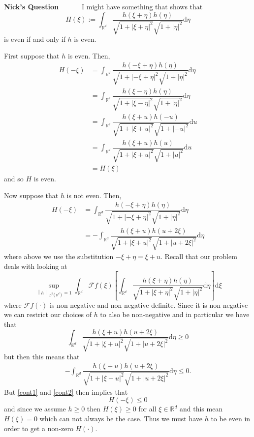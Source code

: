\documentclass[a4paper,11pt]{article}
\numberwithin{equation}{section}
\theoremstyle{plain}
\theoremstyle{definition}
\newcommand{\ud}{\ensuremath{\mathrm{d}}}
\newcommand{\Norm}[1]{\left\|  #1   \right\|}
\newcommand{\R}{\mathbb{R}}
\newcounter{NQ}
\newenvironment{NickQuestion}[1][] %
{\refstepcounter{NQ}
	\begin{mdframed}[backgroundcolor=lightgray]\textbf{Nick's Question \theNQ \: #1~~}~~~\noindent}%
	{\end{mdframed}}
\numberwithin{NQ}{section}
\numberwithin{LQ}{section}
\numberwithin{ZQ}{section}
\begin{document}
\begin{NickQuestion}
	I might have something that shows that 
	\[
		H(\xi) := \int_{\R^d} \dfrac{h(\xi+\eta)h(\eta)}{\sqrt{1+|\xi + \eta|^2}\sqrt{1+|\eta|^2}} \ud \eta
	\]
	is even if and only if $h$ is even. 
	
	First suppose that $h$ is even. Then, 
	\begin{align*}
			H(-\xi) &= \int_{\R^d} \dfrac{h(-\xi+\eta)h(\eta)}{\sqrt{1+|-\xi + \eta|^2}\sqrt{1+|\eta|^2}} \ud \eta
			\\&= \int_{\R^d} \dfrac{h(\xi-\eta)h(\eta)}{\sqrt{1+|\xi - \eta|^2}\sqrt{1+|\eta|^2}} \ud \eta
			\\&= \int_{\R^d} \dfrac{h(\xi+u)h(-u)}{\sqrt{1+|\xi +u|^2}\sqrt{1+|-u|^2}} \ud u
			\\& = \int_{\R^d} \dfrac{h(\xi+u)h(u)}{\sqrt{1+|\xi +u|^2}\sqrt{1+|u|^2}} \ud u
			\\& = H(\xi)
	\end{align*}
and so $H$ is even. 

Now suppose that $h$ is not even. Then,
\begin{align}
		H(-\xi) &= \int_{\R^d} \dfrac{h(-\xi+\eta)h(\eta)}{\sqrt{1+|-\xi + \eta|^2}\sqrt{1+|\eta|^2}} \ud \eta \nonumber
		\\&= -\int_{\R^d} \dfrac{h(\xi+u)h(u+2\xi)}{\sqrt{1+|\xi + u|^2}\sqrt{1+|u+2\xi|^2}} \ud \eta \label{cont1}
\end{align}
where above we use the substitution $-\xi +\eta = \xi +u$. Recall that our problem deals with looking at 
\[
	\sup_{\Norm{h}_{L^2(\R^d)}=1} \int_{\R^d} \mathcal{F}{f}(\xi) \left[ \int_{\R^d} \dfrac{h(\xi+\eta)h(\eta)}{\sqrt{1+|\xi + \eta|^2}\sqrt{1+|\eta|^2}} \ud \eta \right] \ud \xi
\]
where $\mathcal{F}{f}(\cdot)$ is non-negative and non-negative definite. Since it is non-negative we can restrict our choices of $h$ to also be non-negative and in particular we have that 
\[
	\int_{\R^d} \dfrac{h(\xi+u)h(u+2\xi)}{\sqrt{1+|\xi + u|^2}\sqrt{1+|u+2\xi|^2}} \ud \eta \ge 0
\]
but then this means that 
\begin{align}
	-\int_{\R^d} \dfrac{h(\xi+u)h(u+2\xi)}{\sqrt{1+|\xi + u|^2}\sqrt{1+|u+2\xi|^2}} \ud \eta \le 0. \label{cont2}
\end{align}
But \eqref{cont1} and \eqref{cont2} then implies that 
\[ 
	H(-\xi) \le 0
\]
and since we assume $h \ge 0$ then $H(\xi) \ge 0$ for all $\xi \in \R^d$ and this mean $H(\xi)=0$ which can not always be the case. Thus we must have $h$ to be even in order to get a non-zero $H(\cdot)$. 
\end{NickQuestion}
\end{document}
